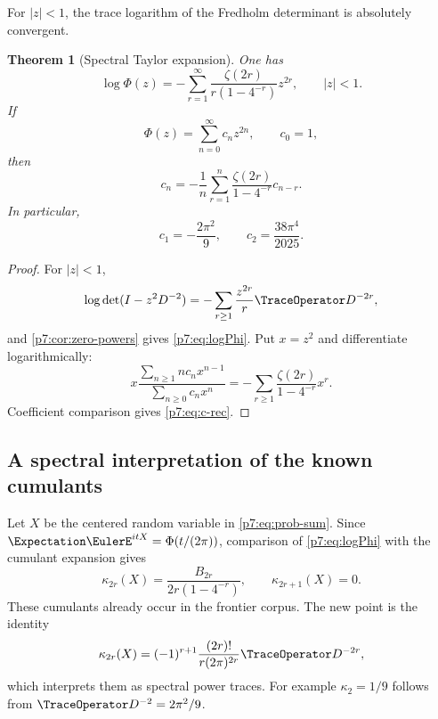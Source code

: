 \documentclass[11pt]{article}
\numberwithin{equation}{section}
\newtheorem{theorem}{Theorem}[section]
\theoremstyle{definition}
\theoremstyle{remark}
\begin{document}
For $|z|<1$, the trace logarithm of the Fredholm determinant is absolutely convergent.

\begin{theorem}[Spectral Taylor expansion]\label{p7:thm:taylor}
One has
\begin{equation}\label{p7:eq:logPhi}
 \boxed{\ \log\Phi(z)
 =-\sum_{r=1}^{\infty}
 \frac{\zeta(2r)}{r(1-4^{-r})}z^{2r},
 \qquad |z|<1.\ }
\end{equation}
If
\[
 \Phi(z)=\sum_{n=0}^{\infty}c_nz^{2n},\qquad c_0=1,
\]
then
\begin{equation}\label{p7:eq:c-rec}
 \boxed{\ c_n=-\frac1n\sum_{r=1}^{n}
 \frac{\zeta(2r)}{1-4^{-r}}c_{n-r}.\ }
\end{equation}
In particular,
\begin{equation}\label{p7:eq:first-c}
 c_1=-\frac{2\pi^2}{9},
 \qquad
 c_2=\frac{38\pi^4}{2025}.
\end{equation}
\end{theorem}

\begin{proof}
For $|z|<1$,
\[
 \log\det(I-z^2D^{-2})
 =-\sum_{r\ge1}\frac{z^{2r}}r\TraceOperator D^{-2r},
\]
and \cref{p7:cor:zero-powers} gives \cref{p7:eq:logPhi}.  Put $x=z^2$ and differentiate logarithmically:
\[
 x\frac{\sum_{n\ge1}nc_nx^{n-1}}{\sum_{n\ge0}c_nx^n}
 =-\sum_{r\ge1}\frac{\zeta(2r)}{1-4^{-r}}x^r.
\]
Coefficient comparison gives \cref{p7:eq:c-rec}.
\end{proof}

\subsection{A spectral interpretation of the known cumulants}

Let $X$ be the centered random variable in \cref{p7:eq:prob-sum}.  Since $\Expectation\EulerE^{itX}=\Phi(t/(2\pi))$, comparison of \cref{p7:eq:logPhi} with the cumulant expansion gives
\begin{equation}\label{p7:eq:cumulants}
 \kappa_{2r}(X)=\frac{B_{2r}}{2r(1-4^{-r})},
 \qquad
 \kappa_{2r+1}(X)=0.
\end{equation}
These cumulants already occur in the frontier corpus.  The new point is the identity
\begin{equation}\label{p7:eq:cumulant-trace}
 \kappa_{2r}(X)
 =(-1)^{r+1}\frac{(2r)!}{r(2\pi)^{2r}}\TraceOperator D^{-2r},
\end{equation}
which interprets them as spectral power traces.  For example $\kappa_2=1/9$ follows from $\TraceOperator D^{-2}=2\pi^2/9$.
\end{document}
